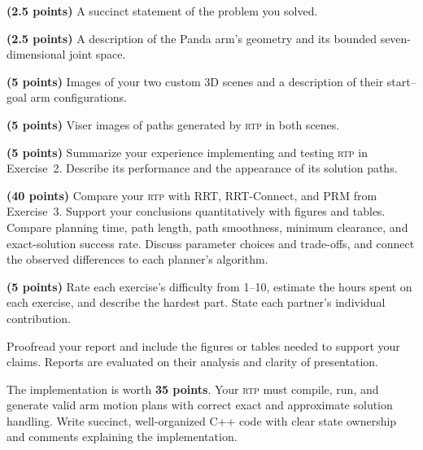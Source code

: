 \documentclass{comp450}
\begin{document}
\begin{itemize*}
    \item \textbf{(2.5 points)}
    A succinct statement of the problem you solved.
    \item \textbf{(2.5 points)}
    A description of the Panda arm's geometry and its bounded seven-dimensional joint space.
    \item \textbf{(5 points)}
    Images of your two custom 3D scenes and a description of their start--goal arm configurations.
    \item \textbf{(5 points)}
    Viser images of paths generated by \textsc{rtp} in both scenes.
    \item \textbf{(5 points)}
    Summarize your experience implementing and testing \textsc{rtp} in Exercise~2.
    Describe its performance and the appearance of its solution paths.
    \item \textbf{(40 points)}
    Compare your \textsc{rtp} with RRT, RRT-Connect, and PRM from Exercise~3.
    Support your conclusions quantitatively with figures and tables.
    Compare planning time, path length, path smoothness, minimum clearance, and exact-solution success rate.
    Discuss parameter choices and trade-offs, and connect the observed differences to each planner's algorithm.
    \item \textbf{(5 points)}
    Rate each exercise's difficulty from 1--10, estimate the hours spent on each exercise, and describe the hardest part.
    State each partner's individual contribution.
\end{itemize*}

Proofread your report and include the figures or tables needed to support your claims.
Reports are evaluated on their analysis and clarity of presentation.

The implementation is worth \textbf{35 points}.
Your \textsc{rtp} must compile, run, and generate valid arm motion plans with correct exact and approximate solution handling.
Write succinct, well-organized C++ code with clear state ownership and comments explaining the implementation.
\end{document}
